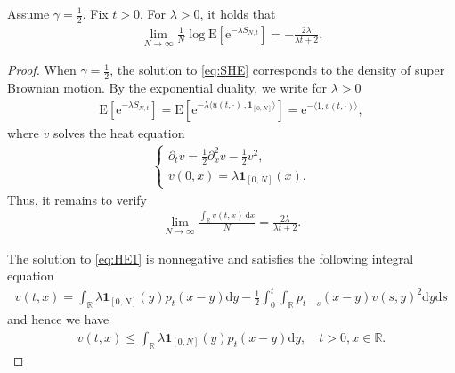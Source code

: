 \documentclass[12pt, reqno]{amsart}
\newcommand{\R}{{\mathbb{R}}}
\newcommand{\E}{\mathrm{E}}
\renewcommand{\d}{\mathrm{d}}
\newcommand{\<}{\langle}
\renewcommand{\>}{\rangle}
\newcommand{\e}{\mathrm{e}}
\begin{document}
\begin{theorem}\label{th:LDP}
          Assume $\gamma=\frac12$. Fix $t>0$. For $\lambda>0$, it holds that
          \begin{align}\label{eq:LDP2}
           \lim_{N\to\infty} \frac1N\log \E\left[\e^{-\lambda S_{N,t}}\right]= -\frac{2\lambda}{\lambda t+2}.
          \end{align}
\end{theorem}
\begin{proof}
           When $\gamma=\frac12$, the solution to \eqref{eq:SHE} corresponds to the density of super Brownian motion. By 
           the exponential duality, we write for $\lambda>0$
\begin{align*}
\E\left[\e^{-\lambda S_{N,t}}\right] =\E\left[\e^{-\lambda \langle u(t, \cdot)\,, 
\bm{1}_{[0, N]}\rangle}\right] = \e^{-\langle 1, v(t, \cdot)\rangle},
\end{align*}
where $v$ solves the heat equation
\begin{align}\label{eq:HE1}
\begin{cases}
\partial_tv= \frac12 \partial_x^2 v -\frac12 v^2,\\
v(0, x)= \lambda \bm{1}_{[0, N]}(x).
\end{cases}
\end{align}
Thus, it remains to verify 
\begin{align}\label{eq:LDPlim}
\lim_{N\to\infty} \frac{\int_\R v(t,x)\, \d x}{N} = \frac{2\lambda}{\lambda t+2}.
\end{align}


The solution to \eqref{eq:HE1} is nonnegative and satisfies the following integral equation
\begin{align*}
v(t,x)= \int_\R \lambda \bm{1}_{[0, N]}(y) p_t(x-y)\d y -\frac12 \int_0^t\int_\R p_{t-s}(x-y)v(s, y)^2\d y\d s
\end{align*}
and hence we have 
\begin{align}\label{eq:vbound}
v(t,x ) \leq  \int_\R \lambda \bm{1}_{[0, N]}(y) p_t(x-y)\d y, \quad t>0, x\in\R. 
\end{align}


\end{proof}
\end{document}
